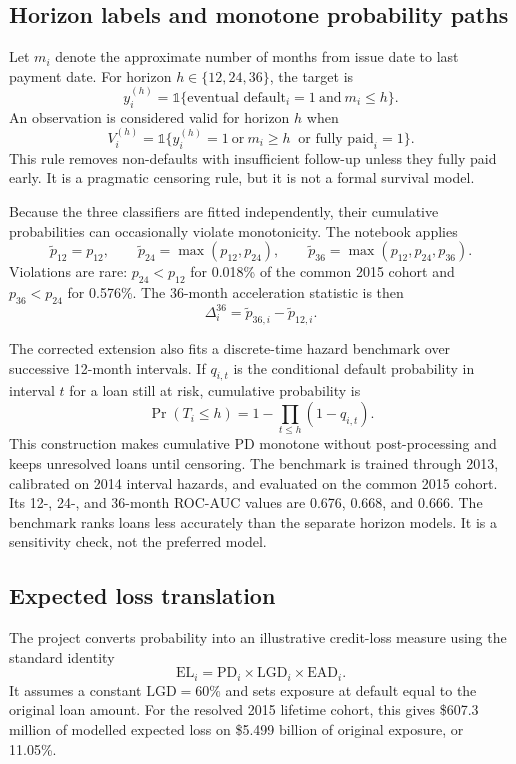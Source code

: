 \documentclass[11pt]{article}
\begin{document}
\subsection{Horizon labels and monotone probability paths}

Let $m_i$ denote the approximate number of months from issue date to last payment
date. For horizon $h\in\{12,24,36\}$, the target is
\[
  y_i^{(h)} =
  \mathbb{1}\{\text{eventual default}_i=1\ \text{and}\ m_i\le h\}.
\]
An observation is considered valid for horizon $h$ when
\[
  V_i^{(h)} =
  \mathbb{1}\{y_i^{(h)}=1\ \text{or}\ m_i\ge h\
  \text{ or fully paid}_i=1\}.
\]
This rule removes non-defaults with insufficient follow-up unless they fully paid
early. It is a pragmatic censoring rule, but it is not a formal survival model.

Because the three classifiers are fitted independently, their cumulative
probabilities can occasionally violate monotonicity. The notebook applies
\[
  \widetilde p_{12}=p_{12},\qquad
  \widetilde p_{24}=\max(p_{12},p_{24}),\qquad
  \widetilde p_{36}=\max(p_{12},p_{24},p_{36}).
\]
Violations are rare: $p_{24}<p_{12}$ for 0.018\% of the common 2015 cohort and
$p_{36}<p_{24}$ for 0.576\%. The 36-month acceleration statistic is then
\[
  \Delta_i^{36} = \widetilde p_{36,i}-\widetilde p_{12,i}.
\]

The corrected extension also fits a discrete-time hazard benchmark over successive
12-month intervals. If $q_{i,t}$ is the conditional default probability in
interval $t$ for a loan still at risk, cumulative probability is
\[
  \Pr(T_i\le h)=1-\prod_{t\le h}(1-q_{i,t}).
\]
This construction makes cumulative PD monotone without post-processing and keeps
unresolved loans until censoring. The benchmark is trained through 2013,
calibrated on 2014 interval hazards, and evaluated on the common 2015 cohort. Its
12-, 24-, and 36-month ROC-AUC values are 0.676, 0.668, and 0.666. The benchmark
ranks loans less accurately than the separate horizon models. It is a sensitivity
check, not the preferred model.

\subsection{Expected loss translation}

The project converts probability into an illustrative credit-loss measure using
the standard identity
\[
  \mathrm{EL}_i = \mathrm{PD}_i\times\mathrm{LGD}_i\times\mathrm{EAD}_i.
\]
It assumes a constant $\mathrm{LGD}=60\%$ and sets exposure at default equal to
the original loan amount. For the resolved 2015 lifetime cohort, this gives
\$607.3 million of modelled expected loss on \$5.499 billion of original exposure,
or 11.05\%.
\end{document}
